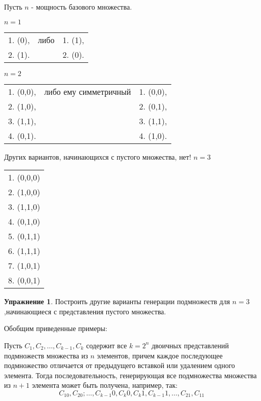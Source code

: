 \documentclass[12pt,a4paper]{article}
\theoremstyle{plain}
\theoremstyle{definition}
\newtheorem*{task}{Упражнение}
\theoremstyle{remark}
\begin{document}
Пусть $n$ - мощность базового множества.

$n=1$

\begin{tabular}{ccc}
1. (0), & либо & 1. (1), \\
2. (1). & & 2. (0).
\end{tabular}

$n=2$

\begin{tabular}{ccc}
1. (0,0), & либо ему симметричный & 1. (0,0), \\
2. (1,0), & & 2. (0,1), \\
3. (1,1), & & 3. (1,1), \\
4. (0,1). & & 4. (1,0). \\
\end{tabular}

Других вариантов, начинающихся с пустого множества, нет!
$n=3$

\begin{tabular}{c}
1. (0,0,0) \\
2. (1,0,0) \\
3. (1,1,0) \\
4. (0,1,0) \\
5. (0,1,1) \\
6. (1,1,1) \\
7. (1,0,1) \\
8. (0,0,1) \\
\end{tabular}

\begin{task}
Построить другие варианты генерации подмножеств для $n=3$,начинающиеся с представления пустого множества.
\end{task}

Обобщим приведенные примеры:

Пусть $C_1, C_2, \ldots, C_{k-1}, C_k$ содержит все $k=2^n$ двоичных представлений подмножеств множества из $n$ элементов, причем каждое последующее подмножество отличается от предыдущего вставкой или удалением одного элемента. Тогда последовательность, генерирующая все подмножества множества из $n+1$ элемента может быть получена, например, так:
\[ C_10, C_20; \ldots, C_{k-1}0, C_k0, C_k1, C_{k-1}1, \ldots, C_21, C_11 \]
\end{document}
